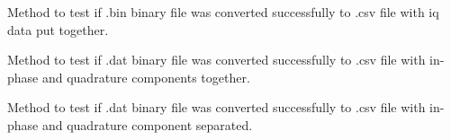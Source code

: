 \documentclass[letterpaper,10pt,english]{sphinxmanual}
\begin{document}
\begin{fulllineitems}
\begin{fulllineitems}
\end{fulllineitems}


\begin{fulllineitems}
\label{\detokenize{Test:test.TestParser.test_TI}}
Method to test if .bin binary file was converted successfully to .csv file with iq data put together.

\end{fulllineitems}


\begin{fulllineitems}
\label{\detokenize{Test:test.TestParser.test_iq}}
Method to test if .dat binary file was converted successfully to .csv file with in-phase and quadrature
components together.

\end{fulllineitems}


\begin{fulllineitems}
\label{\detokenize{Test:test.TestParser.test_raw}}
Method to test if .dat binary file was converted successfully to .csv file with in-phase and quadrature
component separated.

\end{fulllineitems}


\end{fulllineitems}






\end{document}
